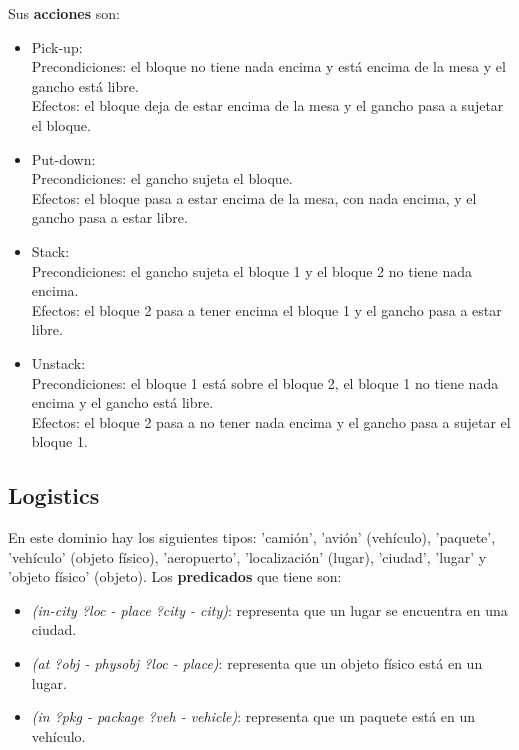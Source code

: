 \documentclass{uc3mpracticas}
\begin{document}
  Sus \textbf{acciones} son:
  \begin{itemize}
    \item Pick-up:
    \\Precondiciones: el bloque no tiene nada encima y está encima de la mesa y el gancho está libre.
    \\Efectos: el bloque deja de estar encima de la mesa y el gancho pasa a sujetar el bloque.
    \item Put-down:
    \\Precondiciones: el gancho sujeta el bloque.
    \\Efectos: el bloque pasa a estar encima de la mesa, con nada encima, y el gancho pasa a estar libre.
    \item Stack:
    \\Precondiciones: el gancho sujeta el bloque 1 y el bloque 2 no tiene nada encima.
    \\Efectos: el bloque 2 pasa a tener encima el bloque 1 y el gancho pasa a estar libre.
    \item Unstack:
    \\Precondiciones: el bloque 1 está sobre el bloque 2, el bloque 1 no tiene nada encima y el gancho está libre.
    \\Efectos: el bloque 2 pasa a no tener nada encima y el gancho pasa a sujetar el bloque 1.
  \end{itemize}



  \subsection{Logistics}

  En este dominio hay los siguientes tipos: 'camión', 'avión' (vehículo), 'paquete', 'vehículo' (objeto físico), 'aeropuerto', 'localización' (lugar), 'ciudad', 'lugar' y 'objeto físico' (objeto). Los \textbf{predicados} que tiene son:
  \begin{itemize}
    \item \textit{(in-city ?loc - place ?city - city)}: representa que un lugar se encuentra en una ciudad.
  	\item \textit{(at ?obj - physobj ?loc - place)}: representa que un objeto físico está en un lugar.
  	\item \textit{(in ?pkg - package ?veh - vehicle)}: representa que un paquete está en un vehículo.
  \end{itemize}
\end{document}
